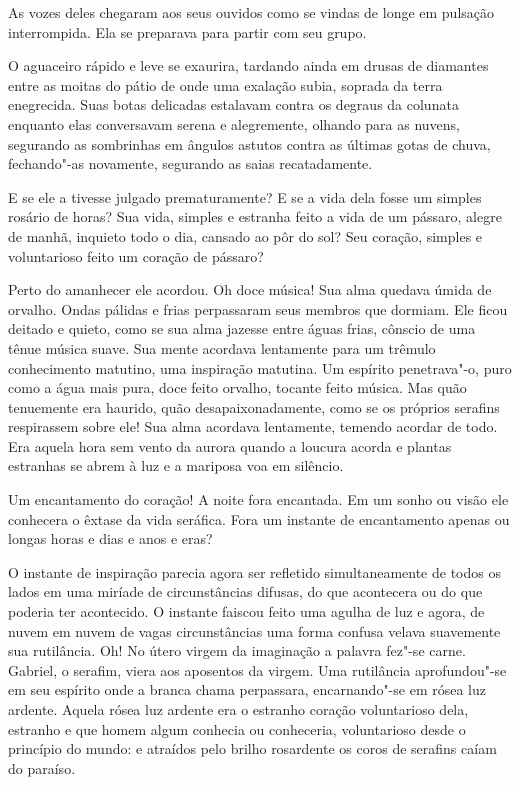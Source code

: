 As vozes deles chegaram aos seus ouvidos como se vindas de longe em
pulsação interrompida. Ela se preparava para partir com seu grupo.

O aguaceiro rápido e leve se exaurira, tardando ainda em drusas de
diamantes entre as moitas do pátio de onde uma exalação subia, soprada
da terra enegrecida. Suas botas delicadas estalavam contra os degraus
da colunata enquanto elas conversavam serena e alegremente, olhando
para as nuvens, segurando as sombrinhas em ângulos astutos contra as
últimas gotas de chuva, fechando"-as novamente, segurando as saias
recatadamente.

E se ele a tivesse julgado prematuramente? E se a vida dela fosse um
simples rosário de horas? Sua vida, simples e estranha feito a vida de
um pássaro, alegre de manhã, inquieto todo o dia, cansado ao
pôr do sol? Seu coração, simples e voluntarioso feito um coração de
pássaro?

\asterisc

Perto do amanhecer ele acordou. Oh doce música! Sua alma quedava úmida de
orvalho. Ondas pálidas e frias perpassaram seus membros que
dormiam. Ele ficou deitado e quieto, como se sua alma jazesse entre
águas frias, cônscio de uma tênue música suave. Sua mente acordava
lentamente para um trêmulo conhecimento matutino, uma inspiração
matutina. Um espírito penetrava"-o, puro como a água mais pura, doce
feito orvalho, tocante feito música. Mas quão tenuemente era haurido,
quão desapaixonadamente, como se os próprios serafins respirassem sobre
ele! Sua alma acordava lentamente, temendo acordar de todo. Era aquela
hora sem vento da aurora quando a loucura acorda e plantas estranhas se
abrem à luz e a mariposa voa em silêncio.

Um encantamento do coração! A noite fora encantada. Em um sonho ou visão
ele conhecera o êxtase da vida seráfica. Fora um instante de
encantamento apenas ou longas horas e dias e anos e eras?

O instante de inspiração parecia agora ser refletido simultaneamente de
todos os lados em uma miríade de circunstâncias difusas, do que acontecera
ou do que poderia ter acontecido. O instante faiscou feito uma agulha de luz
e agora, de nuvem em nuvem de vagas circunstâncias uma forma confusa
velava suavemente sua rutilância. Oh! No útero virgem da imaginação a palavra
fez"-se carne. Gabriel, o serafim, viera aos aposentos da virgem. Uma
rutilância aprofundou"-se em seu espírito onde a branca chama
perpassara, encarnando"-se em rósea luz ardente. Aquela rósea luz
ardente era o estranho coração voluntarioso dela, estranho e que homem
algum conhecia ou conheceria, voluntarioso desde o princípio do mundo:
e atraídos pelo brilho rosardente os coros de serafins caíam do   
paraíso.

